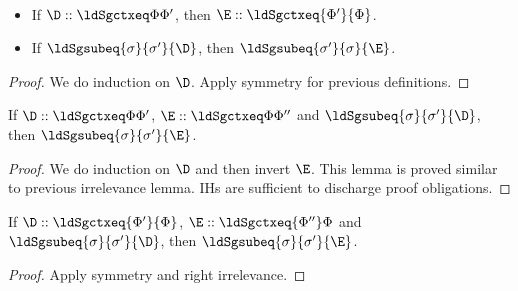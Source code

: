 \begin{lemma}[Symmetry] $ $
  \begin{itemize}
  \item If $\D :: \ldSgctxeq \Phi{\Phi'}$, then $\E :: \ldSgctxeq{\Phi'}{\Phi}$.
  \item If $\ldSgsubeq{\sigma}{\sigma'}{\D}$, then
  $\ldSgsubeq{\sigma'}{\sigma}{\E}$.
  \end{itemize}
\end{lemma}
\begin{proof}
  We do induction on $\D$. %
  Apply symmetry for previous definitions. %
\end{proof}

\begin{lemma}
  If $\D :: \ldSgctxeq \Phi{\Phi'}$, $\E :: \ldSgctxeq \Phi{\Phi''}$ and
  $\ldSgsubeq{\sigma}{\sigma'}{\D}$, then $\ldSgsubeq{\sigma}{\sigma'}{\E}$.
\end{lemma}
\begin{proof}
  We do induction on $\D$ and then invert $\E$. %
  This lemma is proved similar to previous irrelevance lemma. %
  IHs are sufficient to discharge proof obligations. 
\end{proof}

\begin{lemma}
  If $\D :: \ldSgctxeq {\Phi'}{\Phi}$, $\E :: \ldSgctxeq {\Phi''}\Phi$ and
  $\ldSgsubeq{\sigma}{\sigma'}{\D}$, then $\ldSgsubeq{\sigma}{\sigma'}{\E}$.
\end{lemma}
\begin{proof}
  Apply symmetry and right irrelevance. 
\end{proof}

